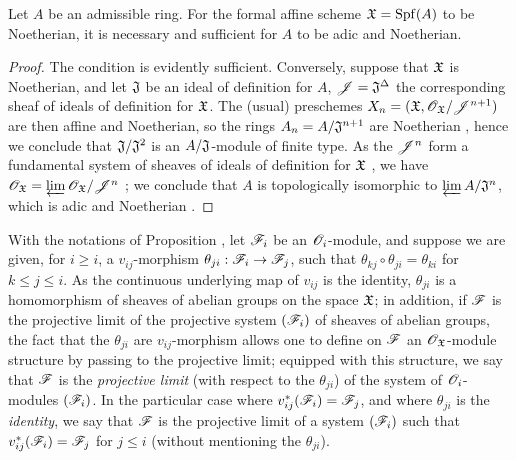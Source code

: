 \begin{cor}[10.6.5]
\label{1.10.6.5}
Let $A$ be an admissible ring.
For the formal affine scheme $\mathfrak{X}={\mathop{\mathrm{Spf}}\nolimits}(A)$ to be Noetherian, it is necessary and sufficient for $A$ to be adic and Noetherian.
\end{cor}

\begin{proof}
\label{proof-1.10.6.5}
The condition is evidently sufficient.
Conversely, suppose that $\mathfrak{X}$ is Noetherian, and let $\mathfrak{J}$ be an ideal of definition for $A$, $\mathscr{J}=\mathfrak{J}^\Delta$ the corresponding sheaf of ideals of definition for $\mathfrak{X}$.
The (usual) preschemes $X_n=(\mathfrak{X},\mathscr{O}_\mathfrak{X}/\mathscr{J}^{n+1})$ are then affine and Noetherian, so the rings $A_n=A/\mathfrak{J}^{n+1}$ are Noetherian , hence we conclude that $\mathfrak{J}/\mathfrak{J}^2$ is an $A/\mathfrak{J}$-module of finite type.
As the $\mathscr{J}^n$ form a fundamental system of sheaves of ideals of definition for $\mathfrak{X}$ , we have $\mathscr{O}_\mathfrak{X}=\varprojlim\mathscr{O}_\mathfrak{X}/\mathscr{J}^n$ ; we conclude  that $A$ is topologically isomorphic to $\varprojlim A/\mathfrak{J}^n$, which is adic and Noetherian .
\end{proof}

\begin{rmk}[10.6.6]
\label{1.10.6.6}
With the notations of Proposition , let $\mathscr{F}_i$ be an $\mathscr{O}_i$-module, and suppose we are given, for $i\geqslant i$, a $v_{ij}$-morphism $\theta_{ji}:\sh{F}_i\to\sh{F}_j$, such that $\theta_{kj}\circ\theta_{ji}=\theta_{ki}$ for $k\leqslant j\leqslant i$.
As the continuous underlying map of $v_{ij}$ is the identity, $\theta_{ji}$ is a homomorphism of sheaves of abelian groups on the space $\mathfrak{X}$; in addition, if $\mathscr{F}$ is the projective limit of the projective system $(\mathscr{F}_i)$ of sheaves of abelian groups, the fact that the $\theta_{ji}$ are $v_{ij}$-morphism allows one to define on $\mathscr{F}$ an $\mathscr{O}_\mathfrak{X}$-module structure by passing to the projective limit; equipped with this structure, we say that $\mathscr{F}$ is the \emph{projective limit} (with respect to the $\theta_{ji}$) of the system of $\mathscr{O}_i$-modules $(\mathscr{F}_i)$.
In the particular case where $v_{ij}^*(\mathscr{F}_i)=\mathscr{F}_j$, and where $\theta_{ji}$ is the \emph{identity}, we say that $\mathscr{F}$ is the projective limit of a system $(\mathscr{F}_i)$ such that $v_{ij}^*(\mathscr{F}_i)=\mathscr{F}_j$ for $j\leqslant i$ (without mentioning the $\theta_{ji}$).
\end{rmk}

